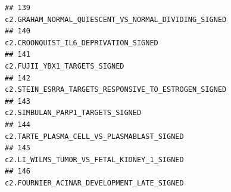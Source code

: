 \documentclass{article}\usepackage[]{graphicx}\usepackage[]{color}
\makeatletter
\newenvironment{kframe}{%
 \def\at@end@of@kframe{}%
 \ifinner\ifhmode%
  \def\at@end@of@kframe{\end{minipage}}%
  \begin{minipage}{\columnwidth}%
 \fi\fi%
 \def\FrameCommand##1{\hskip\@totalleftmargin \hskip-\fboxsep
 \colorbox{shadecolor}{##1}\hskip-\fboxsep
     \hskip-\linewidth \hskip-\@totalleftmargin \hskip\columnwidth}%
 \MakeFramed {\advance\hsize-\width
   \@totalleftmargin\z@ \linewidth\hsize
   \@setminipage}}%
 {\par\unskip\endMakeFramed%
 \at@end@of@kframe}
\newenvironment{knitrout}{}{} %
\makeatother
\begin{document}
\begin{knitrout}
\begin{kframe}
\begin{verbatim}
## 139                                                                                                                                                                                                                                                                                                  c2.GRAHAM_NORMAL_QUIESCENT_VS_NORMAL_DIVIDING_SIGNED
## 140                                                                                                                                                                                                                                                                                                                  c2.CROONQUIST_IL6_DEPRIVATION_SIGNED
## 141                                                                                                                                                                                                                                                                                                                          c2.FUJII_YBX1_TARGETS_SIGNED
## 142                                                                                                                                                                                                                                                                                                  c2.STEIN_ESRRA_TARGETS_RESPONSIVE_TO_ESTROGEN_SIGNED
## 143                                                                                                                                                                                                                                                                                                                      c2.SIMBULAN_PARP1_TARGETS_SIGNED
## 144                                                                                                                                                                                                                                                                                                            c2.TARTE_PLASMA_CELL_VS_PLASMABLAST_SIGNED
## 145                                                                                                                                                                                                                                                                                                            c2.LI_WILMS_TUMOR_VS_FETAL_KIDNEY_1_SIGNED
## 146                                                                                                                                                                                                                                                                                                            c2.FOURNIER_ACINAR_DEVELOPMENT_LATE_SIGNED

\end{verbatim}
\end{kframe}
\end{knitrout}
\end{document}
